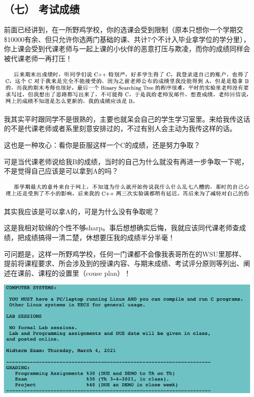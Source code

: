 \documentclass[9pt, b5paper]{article}
\begin{document}
\subsection{（七） 考试成绩}
\label{sec:org391fce7}

前面已经讲到，在一所野鸡学校，你的选课会受到限制（原本只想你一个学期交\$10000有余、但只允许你选两门基础的课、共计7个不计入毕业拿学位的学分里），你上课会受到代课老师与一起上课的小伙伴的恶意打压与欺凌，而你的成绩同样会被代课老师一再打压！

\begin{center}
\includegraphics[width=.9\linewidth]{./pic/backups_plans_20210424_205932.png}
\end{center}

我其实平时跟同学不是很熟的，主要也就呆会自己的学生学习室里。来给我传这话的不是代课老师或者系里刻意安排过的，不过有别人会主动为我传这样的话。

这也是一种攻心：看你是臣服这样一个C的成绩，还是努力争取？

可是当代课老师说给我B的成绩，当时的自己为什么就没有再进一步争取一下呢，不是觉得自己应该是可以拿到A的吗？

\begin{center}
\includegraphics[width=.9\linewidth]{./pic/backups_plans_20210424_210025.png}
\end{center}

其实我应该是可以拿A的，可是为什么没有争取呢？

这是我相对软绵的个性不够sharp。事后想想确实后悔，我就应该同代课老师查成绩，把成绩搞得一清二楚，休想要压我的成绩半分半毫！

可问题是，这样一所野鸡学校，任何一门课都不会像我表哥所在的WSU里那样、提前将课程要求、所会涉及到的授课内容、与期末成绩、考试评分原则等列出、阐述在课前、课程的设置里（couse plan）！

\begin{center}
\includegraphics[width=.9\linewidth]{./pic/backups_plans_20210425_171604.png}
\end{center}
\end{document}
